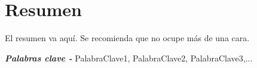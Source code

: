 \renewcommand{\keywords}{{\itshape \bfseries Palabras clave - }}
\chapter*{Resumen} 

El resumen va aquí. Se recomienda que no ocupe más de una cara. 

\keywords{PalabraClave1, PalabraClave2, PalabraClave3,...}